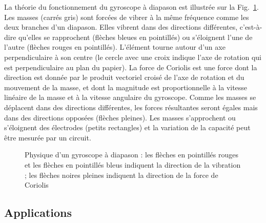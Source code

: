 {La théorie du fonctionnement du gyroscope à diapason est illustrée sur la Fig.~\ref{fig.tuning-gyro}. Les masses (carrés gris) sont forcées de vibrer à la même fréquence comme les deux branches d'un diapason. Elles vibrent dans des directions différentes, c'est-à-dire qu'elles se rapprochent (flèches bleues en pointillés) ou s'éloignent l'une de l'autre (flèches rouges en pointillés). L'élément tourne autour d'un axe perpendiculaire à son centre (le cercle avec une croix indique l'axe de rotation qui est perpendiculaire au plan du papier). La force de Coriolis est une force dont la direction est donnée par le produit vectoriel croisé de l'axe de rotation et du mouvement de la masse, et dont la magnitude est proportionnelle à la vitesse linéaire de la masse et à la vitesse angulaire du gyroscope. Comme les masses se déplacent dans des directions différentes, les forces résultantes seront égales mais dans des directions opposées (flèches pleines). Les masses s'approchent ou s'éloignent des électrodes (petits rectangles) et la variation de la capacité peut être mesurée par un circuit.

\begin{figure}
\begin{center}
\end{center}
\caption{Physique d'un gyroscope à diapason : les flèches en pointillés rouges et les flèches en pointillés bleus indiquent la direction de la vibration ; les flèches noires pleines indiquent la direction de la force de Coriolis}\label{fig.tuning-gyro}
\end{figure}

\subsection{Applications}

}
